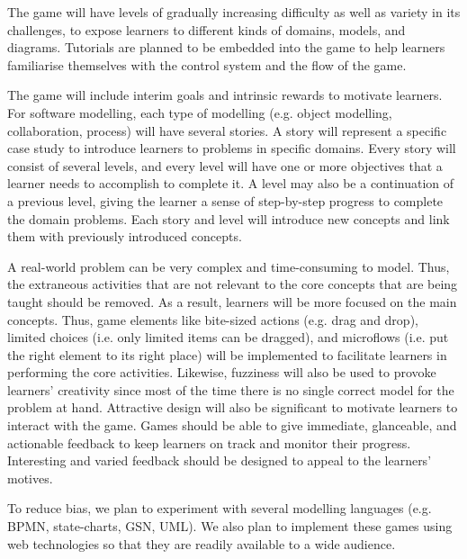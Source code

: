 \documentclass[12pt, a4paper]{report}
\begin{document}
The game will have levels of gradually increasing difficulty as well as variety in its challenges, to expose learners to different kinds of domains, models, and diagrams. Tutorials are planned to be embedded into the game to help learners familiarise themselves with the control system and the flow of the game. 

The game will include interim goals and intrinsic rewards to motivate learners. For software modelling, each type of modelling (e.g. object modelling, collaboration, process) will have several stories. A story will represent a specific case study to introduce learners to problems in specific domains. Every story will consist of several levels, and every level will have one or more objectives that a learner needs to accomplish to complete it. A level may also be a continuation of a previous level, giving the learner a sense of step-by-step progress to complete the domain problems. Each story and level will introduce new concepts and link them with previously introduced concepts.

A real-world problem can be very complex and time-consuming to model. Thus, the extraneous activities that are not relevant to the core concepts that are being taught should be removed. As a result, learners will be more focused on the main concepts. Thus, game elements like bite-sized actions (e.g. drag and drop), limited choices (i.e. only limited items can be dragged), and microflows (i.e. put the right element to its right place) will be implemented to facilitate learners in performing the core activities. Likewise, fuzziness will also be used to provoke learners' creativity since most of the time there is no single correct model for the problem at hand. Attractive design will also be significant to motivate learners to interact with the game. Games should be able to give immediate, glanceable, and actionable feedback to keep learners on track and monitor their progress. Interesting and varied feedback should be designed to appeal to the learners' motives. 

To reduce bias, we plan to experiment with several modelling languages (e.g. BPMN, state-charts, GSN, UML). We also plan to implement these games using web technologies so that they are readily available to a wide audience.
\end{document}
